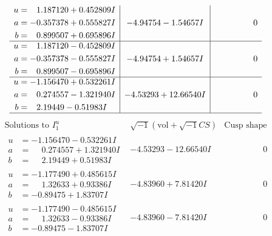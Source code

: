 \documentclass[1p]{elsarticle_modified}
\theoremstyle{definition}
\newcommand{\I}{\sqrt{-1}}
\begin{document}
$$\begin{array}{c|c|c}
\begin{aligned}
u &= \phantom{-}1.187120 + 0.452809 I \\
a &= -0.357378 + 0.555827 I \\
b &= \phantom{-}0.899507 + 0.695896 I\end{aligned}
 & -4.94754 - 1.54657 I & \phantom{-0.000000 } 0 \\ \hline\begin{aligned}
u &= \phantom{-}1.187120 - 0.452809 I \\
a &= -0.357378 - 0.555827 I \\
b &= \phantom{-}0.899507 - 0.695896 I\end{aligned}
 & -4.94754 + 1.54657 I & \phantom{-0.000000 } 0 \\ \hline\begin{aligned}
u &= -1.156470 + 0.532261 I \\
a &= \phantom{-}0.274557 - 1.321940 I \\
b &= \phantom{-}2.19449 - 0.51983 I\end{aligned}
 & -4.53293 + 12.66540 I & \phantom{-0.000000 } 0\\
 \hline 
 \end{array}$$\newpage$$\begin{array}{c|c|c}  
\text{Solutions to }I^u_{1}& \I (\text{vol} + \sqrt{-1}CS) & \text{Cusp shape}\\
 \hline 
\begin{aligned}
u &= -1.156470 - 0.532261 I \\
a &= \phantom{-}0.274557 + 1.321940 I \\
b &= \phantom{-}2.19449 + 0.51983 I\end{aligned}
 & -4.53293 - 12.66540 I & \phantom{-0.000000 } 0 \\ \hline\begin{aligned}
u &= -1.177490 + 0.485615 I \\
a &= \phantom{-}1.32633 + 0.93386 I \\
b &= -0.89475 + 1.83707 I\end{aligned}
 & -4.83960 + 7.81420 I & \phantom{-0.000000 } 0 \\ \hline\begin{aligned}
u &= -1.177490 - 0.485615 I \\
a &= \phantom{-}1.32633 - 0.93386 I \\
b &= -0.89475 - 1.83707 I\end{aligned}
 & -4.83960 - 7.81420 I & \phantom{-0.000000 } 0 \\ \hline\begin{aligned}

\end{aligned}
\end{array}$$
\end{document}
